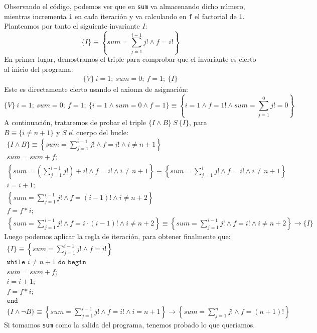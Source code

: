 \begin{ejercicio}
    Observando el código, podemos ver que en \verb|sum| va almacenando dicho número, mientras incrementa \verb|i| en cada iteración y va calculando en \verb|f| el factorial de \verb|i|. Planteamos por tanto el siguiente invariante $I$:
    \begin{equation*}
        \{I\} \equiv \left\{ sum = \sum_{j=1}^{i-1} j! \land f = i! \right\}
    \end{equation*}
    En primer lugar, demostramos el triple para comprobar que el invariante es cierto al inicio del programa:
    \begin{gather*}
        \{V\}\ i = 1;\ sum = 0;\ f=1;\ \{I\}
    \end{gather*}
    Este es directamente cierto usando el axioma de asignación:
    \begin{equation*}
        \{V\}\ i=1;\ sum=0;\ f=1;\ \{i=1 \land sum = 0 \land f = 1\}\equiv \left\{i=1 \land f=1! \land sum = \sum_{j=1}^0 j! = 0\right\}
    \end{equation*}
    A continuación, trataremos de probar el triple $\{I \land B\}\ S\ \{I\}$, para $B \equiv \{i \neq n+1\}$ y $S$ el cuerpo del bucle:
    \begin{gather*}
        \{I \land B\} \equiv \left\{ sum = \sum_{j=1}^{i-1} j! \land f = i! \land i\neq n+1\right\} \\
        sum = sum + f; \\
        \left\{ sum = \left(\sum_{j=1}^{i-1} j!\right)+i! \land f = i! \land i\neq n+1\right\} \equiv \left\{ sum = \sum_{j=1}^{i} j! \land f = i! \land i\neq n+1\right\} \\
        i = i + 1; \\
        \left\{ sum = \sum_{j=1}^{i-1} j! \land f = (i-1)! \land i\neq n+2\right\} \\
        f = f * i; \\
        \left\{ sum = \sum_{j=1}^{i-1} j! \land f = i\cdot (i-1)! \land i\neq n+2\right\} \equiv \left\{ sum = \sum_{j=1}^{i-1} j! \land f = i! \land i\neq n+2\right\} \rightarrow \{I\}
    \end{gather*}
    Luego podemos aplicar la regla de iteración, para obtener finalmente que:
    \begin{gather*}
        \{I\} \equiv \left\{ sum = \sum_{j=1}^{i-1} j! \land f = i!\right\} \\
        \texttt{while\ } i \neq n+1 \texttt{\ do\ begin} \\
        sum = sum + f; \\
        i = i + 1;\\
        f = f * i;\\ 
        \texttt{end} \\
        \{I \land \lnot B\} \equiv \left\{ sum = \sum_{j=1}^{i-1} j! \land f = i! \land i = n+1\right\} \rightarrow  \left\{sum = \sum_{j=1}^n j! \land f = (n+1)! \right\}
    \end{gather*}
    Si tomamos \verb|sum| como la salida del programa, tenemos probado lo que queríamos.
\end{ejercicio}

